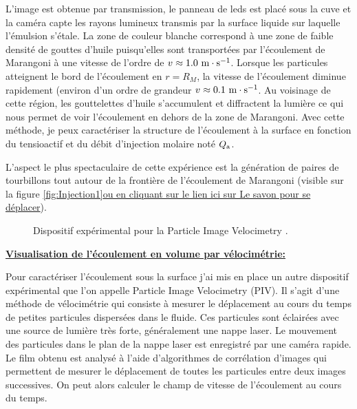 \documentclass[french, 10pt]{article}
\begin{document}
L'image est obtenue par transmission, le panneau de leds est placé sous la cuve et la caméra capte les rayons lumineux transmis par la surface liquide sur laquelle l'émulsion s'étale. La zone de couleur blanche correspond à une zone de faible densité de gouttes d'huile puisqu'elles sont transportées par l'écoulement de Marangoni à une vitesse de l'ordre de $v\approx 1.0~\rm m\cdot s^{-1}$. Lorsque les particules atteignent le bord de l'écoulement en $r=R_{M}$, la vitesse de l'écoulement diminue rapidement (environ d'un ordre de grandeur $v\approx 0.1~\rm m\cdot s^{-1}$. Au voisinage de cette région, les gouttelettes d'huile s'accumulent et diffractent la lumière ce qui nous permet de voir l'écoulement en dehors de la zone de Marangoni. Avec cette méthode, je peux caractériser la structure de l'écoulement à la surface en fonction du tensioactif et du débit d'injection molaire noté $Q_{\rm a}$.\medskip

L'aspect le plus spectaculaire de cette expérience est la génération de paires de tourbillons tout autour de la frontière de l'écoulement de Marangoni (visible sur la figure \ref{fig:Injection1}\href{https://hebergement.universite-paris-saclay.fr/supraconductivite/marangoni/marangoni.html#home}{ou en cliquant sur le lien ici sur \og{}Le savon pour se déplacer\fg{}}).\medskip 



% 

\begin{figure}
  \centering
  \resizebox{.45\textwidth}{!}{}
  \caption{Dispositif expérimental pour la \og{} Particle Image Velocimetry \fg{}.}
  \label{fig:DispositfPIV3D}
\end{figure}

\noindent\underline{\textbf{Visualisation de l'écoulement en volume par vélocimétrie:}}\medskip
% 

Pour caractériser l'écoulement sous la surface j'ai mis en place un autre dispositif expérimental que l'on appelle Particle Image Velocimetry (PIV). Il s'agit d'une méthode de vélocimétrie qui consiste à mesurer le déplacement au cours du temps de petites particules dispersées dans le fluide. Ces particules sont éclairées avec une source de lumière très forte, généralement une nappe laser. Le mouvement des particules dans le plan de la nappe laser est enregistré par une caméra rapide. Le film obtenu est analysé à l'aide d'algorithmes de corrélation d'images qui permettent de mesurer le déplacement de toutes les particules entre deux images successives. On peut alors calculer le champ de vitesse de l'écoulement au cours du temps.\medskip
\end{document}
